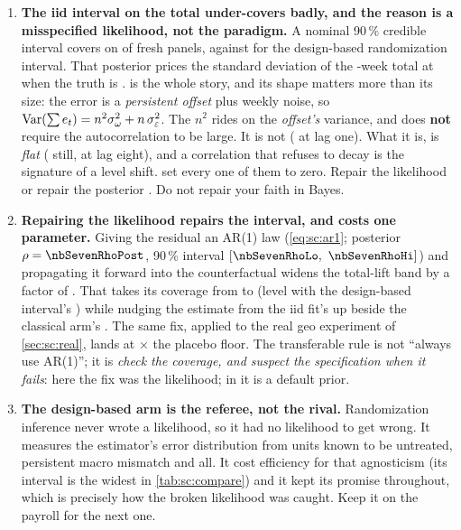 \begin{enumerate}[leftmargin=*, itemsep=.45em]
  \item \textbf{The iid interval on the total under-covers badly, and the reason is a
        misspecified likelihood, not the paradigm.} A nominal 90\,\% credible interval covers on
        \pc{\nbSevenTotalCov} of fresh panels, against \pc{\nbSevenRiCov} for the design-based
        randomization interval. That posterior prices the standard deviation of the
        \nbSevenNPost-week total at \keur{\nbSevenIidSd} when the truth is \keur{\nbSevenSeedSd}.
         is the whole story, and its shape matters more than its size: the error is
        a \emph{persistent offset} plus weekly noise, so
        $\operatorname{Var}(\sum e_t) = n^{2}\sigma_\omega^{2} + n\,\sigma_\varepsilon^{2}$. The $n^{2}$ rides on
        the \emph{offset's} variance, and does \textbf{not} require the autocorrelation to be
        large. It is not (\nbSevenRhoOne{} at lag one). What it is, is \emph{flat}
        (\nbSevenRhoEight{} still, at lag eight), and a correlation that refuses to decay is the
        signature of a level shift.  set every one of them to zero. Repair the
        likelihood or repair the posterior \citep[sandwich-corrected;][]{mueller2013}. Do not
        repair your faith in Bayes.

  \item \textbf{Repairing the likelihood repairs the interval, and costs one parameter.} Giving
        the residual an AR(1) law (\cref{eq:sc:ar1}; posterior $\rho = \nbSevenRhoPost$, 90\,\%
        interval $[\nbSevenRhoLo,\ \nbSevenRhoHi]$) and propagating it forward into the
        counterfactual widens the total-lift band by a factor of \nbSevenWidthRatio{}. That takes its
        coverage from \pc{\nbSevenTotalCov} to \pc{\nbSevenTotalCovArone} (level with the
        design-based interval's \pc{\nbSevenRiCov}) while nudging the estimate from the iid
        fit's \keur{\nbSevenIidTotal} up beside the classical arm's \keur{\nbSevenClTotal}.
        The same fix, applied to the real geo experiment of \cref{sec:sc:real}, lands at
        \nbSevenBArVsFloor$\times$ the placebo floor. The transferable rule is not ``always use
        AR(1)''; it is \emph{check the coverage, and suspect the specification when it fails}:
        here the fix was the likelihood; in  it is a default prior.

  \item \textbf{The design-based arm is the referee, not the rival.} Randomization inference never
        wrote a likelihood, so it had no likelihood to get wrong. It measures the estimator's error
        distribution from units known to be untreated, persistent macro mismatch and all. It cost
        efficiency for that agnosticism (its interval is the widest in \cref{tab:sc:compare})
        and it kept its promise throughout, which is precisely how the broken likelihood was caught.
        Keep it on the payroll for the next one.


\end{enumerate}
